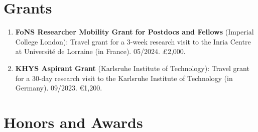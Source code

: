 \documentclass[10pt, ]{article}
\begin{document}
	
	\vspace{10pt}

	\vspace{-12pt}
	\section*{Grants} \vspace{-5pt}
	
	\begin{enumerate}[noitemsep, topsep=0pt]
		\item \textbf{FoNS Researcher Mobility Grant for Postdocs and Fellows} (Imperial College London): Travel grant for a 3-week research visit to the Inria Centre at Université de Lorraine (in France). \hspace{-1pt}05/2024. \hspace{-1pt}£2,000.
		
		\item \textbf{KHYS Aspirant Grant} (Karlsruhe Institute of Technology): Travel grant for a 30-day research visit to the Karlsruhe Institute of Technology (in Germany). 09/2023. €1,200.
	\end{enumerate}
	
	\vspace{10pt}
	
	\vspace{-12pt}
	\section*{Honors and Awards} \vspace{-5pt}
	
\end{document}
